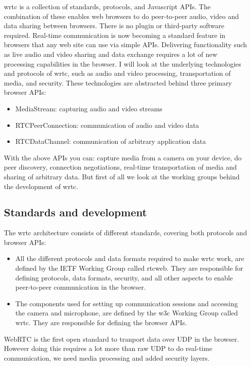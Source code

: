 
\gls{wrtc} is a collection of standards, protocols, and Javascript APIs. The combination of these enables web browsers to do peer-to-peer audio, video and data sharing between browsers. There is no plugin or third-party software required. Real-time communication is now becoming a standard feature in browsers that any web site can use via simple APIs. Delivering functionality such as live audio and video sharing and data exchange requires a lot of new processing capabilities in the browser. I will look at the underlying technologies and protocols of \gls{wrtc}, such as audio and video processing, transportation of media, and security. These technologies are abstracted behind three primary browser APIs:

\begin{itemize}
\item MediaStream: capturing audio and video streams
\item RTCPeerConnection: communication of audio and video data
\item RTCDataChannel: communication of arbitrary application data
\end{itemize}

With the above APIs you can: capture media from a camera on your device, do peer discovery, connection negotiations, real-time transportation of media and sharing of arbitrary data. But first of all we look at the working groups behind the development of \gls{wrtc}.

\subsection{Standards and development}
The \gls{wrtc} architecture consists of different standards, covering both protocols and browser APIs:

\begin{itemize}
\item All the different protocols and data formats required to make \gls{wrtc} work, are defined by the IETF Working Group called \gls{rtcweb}. They are responsible for defining protocols, data formats, security, and all other aspects to enable peer-to-peer communication in the browser.
\item The components used for setting up communication sessions and accessing the camera and microphone, are defined by the \gls{w3c} Working Group called \gls{wrtc}. They are responsible for defining the browser APIs.
\end{itemize}

WebRTC is the first open standard to tranport data over UDP in the browser. However doing this requires a lot more than raw UDP to do real-time communication, we need media processing and added security layers.

